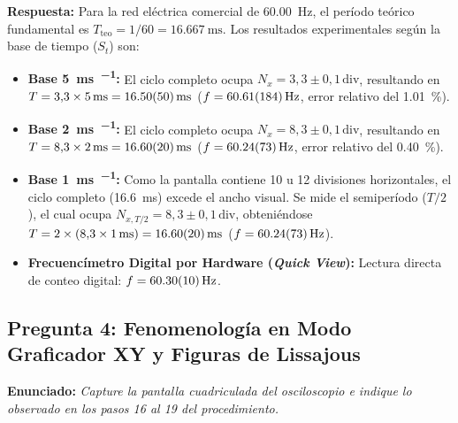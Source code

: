 \begin{appendices}
\textbf{Respuesta:} Para la red eléctrica comercial de \qty{60,00}{\hertz}, el período teórico fundamental es $T_{\text{teo}} = 1/60 = \qty{16,667}{\milli\second}$. Los resultados experimentales según la base de tiempo ($S_t$) son:
\begin{itemize}
    \item \textbf{Base \qty{5}{\milli\second\per\division}:} El ciclo completo ocupa $N_x = 3{,}3 \pm 0{,}1\,\text{div}$, resultando en $T = 3{,}3 \times \qty{5}{\milli\second} = \qty{16,50 \pm 0,50}{\milli\second}$ ($f = \qty{60,61 \pm 1,84}{\hertz}$, error relativo del \qty{1,01}{\percent}).
    \item \textbf{Base \qty{2}{\milli\second\per\division}:} El ciclo completo ocupa $N_x = 8{,}3 \pm 0{,}1\,\text{div}$, resultando en $T = 8{,}3 \times \qty{2}{\milli\second} = \qty{16,60 \pm 0,20}{\milli\second}$ ($f = \qty{60,24 \pm 0,73}{\hertz}$, error relativo del \qty{0,40}{\percent}).
    \item \textbf{Base \qty{1}{\milli\second\per\division}:} Como la pantalla contiene 10 u 12 divisiones horizontales, el ciclo completo (\qty{16,6}{\milli\second}) excede el ancho visual. Se mide el semiperíodo ($T/2$), el cual ocupa $N_{x,T/2} = 8{,}3 \pm 0{,}1\,\text{div}$, obteniéndose $T = 2 \times (8{,}3 \times \qty{1}{\milli\second}) = \qty{16,60 \pm 0,20}{\milli\second}$ ($f = \qty{60,24 \pm 0,73}{\hertz}$).
    \item \textbf{Frecuencímetro Digital por Hardware (\textit{Quick View}):} Lectura directa de conteo digital: $f = \qty{60,30 \pm 0,10}{\hertz}$.
\end{itemize}

\subsection{Pregunta 4: Fenomenología en Modo Graficador XY y Figuras de Lissajous}
\textbf{Enunciado:} \textit{Capture la pantalla cuadriculada del osciloscopio e indique lo observado en los pasos 16 al 19 del procedimiento.}


\end{appendices}
